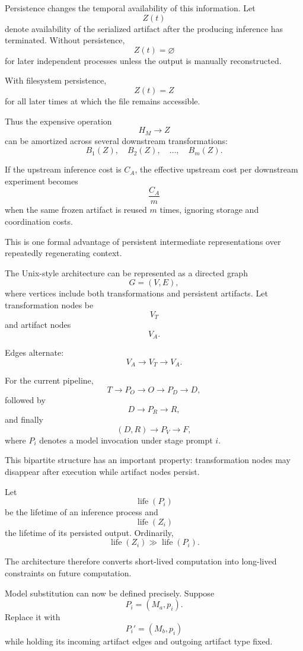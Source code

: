 \documentclass[11pt]{article}
\begin{document}
Persistence changes the temporal availability of this information. Let
\[
    Z(t)
\]
denote availability of the serialized artifact after the producing inference has terminated. Without persistence,
\[
    Z(t)=\varnothing
\]
for later independent processes unless the output is manually reconstructed.

With filesystem persistence,
\[
    Z(t)=Z
\]
for all later times at which the file remains accessible.

Thus the expensive operation
\[
    H_M\rightarrow Z
\]
can be amortized across several downstream transformations:
\[
    B_1(Z),
    \quad
    B_2(Z),
    \quad
    \ldots,
    \quad
    B_m(Z).
\]

If the upstream inference cost is \(C_A\), the effective upstream cost per downstream experiment becomes
\[
    \frac{C_A}{m}
\]
when the same frozen artifact is reused \(m\) times, ignoring storage and coordination costs.

This is one formal advantage of persistent intermediate representations over repeatedly regenerating context.

The Unix-style architecture can be represented as a directed graph
\[
    G=(V,E),
\]
where vertices include both transformations and persistent artifacts. Let transformation nodes be
\[
    V_T
\]
and artifact nodes
\[
    V_A.
\]

Edges alternate:
\[
    V_A\rightarrow V_T\rightarrow V_A.
\]

For the current pipeline,
\[
    T\rightarrow P_O\rightarrow O
    \rightarrow P_D\rightarrow D,
\]
followed by
\[
    D\rightarrow P_R\rightarrow R,
\]
and finally
\[
    (D,R)\rightarrow P_V\rightarrow F,
\]
where \(P_i\) denotes a model invocation under stage prompt \(i\).

This bipartite structure has an important property: transformation nodes may disappear after execution while artifact nodes persist.

Let
\[
    \operatorname{life}(P_i)
\]
be the lifetime of an inference process and
\[
    \operatorname{life}(Z_i)
\]
the lifetime of its persisted output. Ordinarily,
\[
    \operatorname{life}(Z_i)
    \gg
    \operatorname{life}(P_i).
\]

The architecture therefore converts short-lived computation into long-lived constraints on future computation.

Model substitution can now be defined precisely. Suppose
\[
    P_i=(M_a,p_i).
\]
Replace it with
\[
    P_i'=(M_b,p_i)
\]
while holding its incoming artifact edges and outgoing artifact type fixed.
\end{document}
